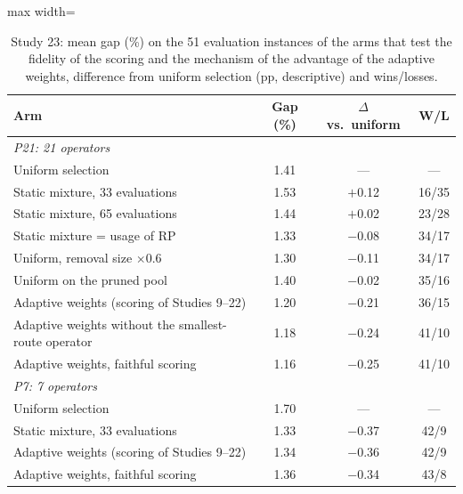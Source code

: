 \begin{table}[t]
\caption{Study 23: mean gap (\%) on the 51 evaluation instances of the arms that test the fidelity of the scoring and the mechanism of the advantage of the adaptive weights, difference from uniform selection (pp, descriptive) and wins/losses.}\label{tab:s23a}
\centering
\small
\begin{adjustbox}{max width=\linewidth}
\begin{tabular}{lccc}
\toprule
Arm & Gap (\%) & $\Delta$ vs.\ uniform & W/L \\
\midrule
\multicolumn{4}{l}{\emph{P21: 21 operators}} \\
Uniform selection & 1.41 & --- & --- \\
Static mixture, 33 evaluations & 1.53 & $+$0.12 & 16/35 \\
Static mixture, 65 evaluations & 1.44 & $+$0.02 & 23/28 \\
Static mixture = usage of RP & 1.33 & $-$0.08 & 34/17 \\
Uniform, removal size $\times$0.6 & 1.30 & $-$0.11 & 34/17 \\
Uniform on the pruned pool & 1.40 & $-$0.02 & 35/16 \\
Adaptive weights (scoring of Studies 9--22) & 1.20 & $-$0.21 & 36/15 \\
Adaptive weights without the smallest-route operator & 1.18 & $-$0.24 & 41/10 \\
Adaptive weights, faithful scoring & 1.16 & $-$0.25 & 41/10 \\
\multicolumn{4}{l}{\emph{P7: 7 operators}} \\
Uniform selection & 1.70 & --- & --- \\
Static mixture, 33 evaluations & 1.33 & $-$0.37 & 42/9 \\
Adaptive weights (scoring of Studies 9--22) & 1.34 & $-$0.36 & 42/9 \\
Adaptive weights, faithful scoring & 1.36 & $-$0.34 & 43/8 \\
\bottomrule
\end{tabular}
\end{adjustbox}
\end{table}

